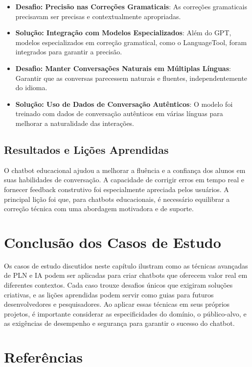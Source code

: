 \documentclass[14pt,a4paper,oneside]{book}
\begin{document}
\begin{itemize}
	\item \textbf{Desafio: Precisão nas Correções Gramaticais}: As correções gramaticais precisavam ser precisas e contextualmente apropriadas.
	\item \textbf{Solução: Integração com Modelos Especializados}: Além do GPT, modelos especializados em correção gramatical, como o LanguageTool, foram integrados para garantir a precisão.
	\item \textbf{Desafio: Manter Conversações Naturais em Múltiplas Línguas}: Garantir que as conversas parecessem naturais e fluentes, independentemente do idioma.
	\item \textbf{Solução: Uso de Dados de Conversação Autênticos}: O modelo foi treinado com dados de conversação autênticos em várias línguas para melhorar a naturalidade das interações.
\end{itemize}

\subsection{Resultados e Lições Aprendidas}

O chatbot educacional ajudou a melhorar a fluência e a confiança dos alunos em suas habilidades de conversação. A capacidade de corrigir erros em tempo real e fornecer feedback construtivo foi especialmente apreciada pelos usuários. A principal lição foi que, para chatbots educacionais, é necessário equilibrar a correção técnica com uma abordagem motivadora e de suporte.

\section{Conclusão dos Casos de Estudo}

Os casos de estudo discutidos neste capítulo ilustram como as técnicas avançadas de PLN e IA podem ser aplicadas para criar chatbots que oferecem valor real em diferentes contextos. Cada caso trouxe desafios únicos que exigiram soluções criativas, e as lições aprendidas podem servir como guias para futuros desenvolvedores e pesquisadores. Ao aplicar essas técnicas em seus próprios projetos, é importante considerar as especificidades do domínio, o público-alvo, e as exigências de desempenho e segurança para garantir o sucesso do chatbot.

\section{Referências}
\end{document}
